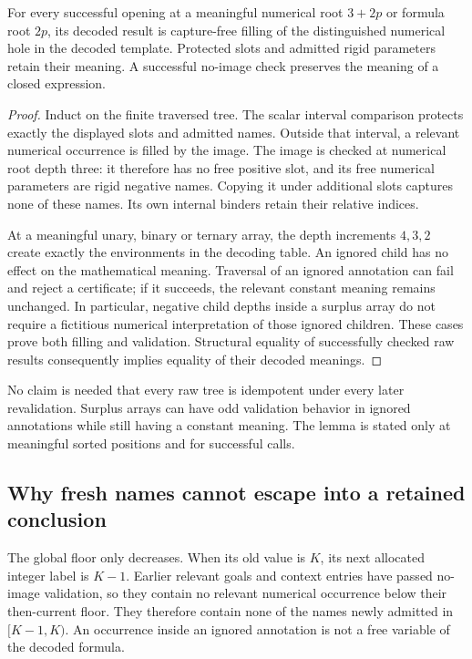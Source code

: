 \begin{lemma}
For every successful opening at a meaningful numerical root
\(3+2p\) or formula root \(2p\), its decoded result is capture-free
filling of the distinguished numerical hole in the decoded template.
Protected slots and admitted rigid parameters retain their meaning.
A successful no-image check preserves the meaning of a closed expression.
\end{lemma}
\begin{proof}
Induct on the finite traversed tree. The scalar interval comparison
protects exactly the displayed slots and admitted names. Outside that
interval, a relevant numerical occurrence is filled by the image. The
image is checked at numerical root depth three: it therefore has no
free positive slot, and its free numerical parameters are rigid negative
names. Copying it under additional slots captures none of these names.
Its own internal binders retain their relative indices.

At a meaningful unary, binary or ternary array, the depth increments
\(4,3,2\) create exactly the environments in the decoding table.
An ignored child has no effect on the mathematical meaning. Traversal
of an ignored annotation can fail and reject a certificate; if it
succeeds, the relevant constant meaning remains unchanged. In
particular, negative child depths inside a surplus array do not require
a fictitious numerical interpretation of those ignored children.
These cases prove both filling and validation. Structural equality of
successfully checked raw results consequently implies equality of
their decoded meanings.
\end{proof}

No claim is needed that every raw tree is idempotent under every later
revalidation. Surplus arrays can have odd validation behavior in ignored
annotations while still having a constant meaning. The lemma is stated
only at meaningful sorted positions and for successful calls.

\subsection{Why fresh names cannot escape into a retained conclusion}

The global floor only decreases. When its old value is \(K\), its
next allocated integer label is \(K-1\). Earlier relevant goals and
context entries have passed no-image validation, so they contain no
relevant numerical occurrence below their then-current floor. They
therefore contain none of the names newly admitted in \([K-1,K)\).
An occurrence inside an ignored annotation is not a free variable of
the decoded formula.


